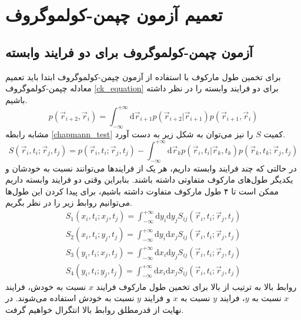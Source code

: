 \chapter{تعمیم آزمون چپمن-کولموگروف}
\label{ch3} 

\section{آزمون چپمن-کولموگروف برای دو فرایند وابسته}

برای تخمین طول مارکوف با استفاده از آزمون چپمن-کولموگروف ابتدا باید تعمیم معادله چپمن-کولموگروف \ref{ck_equation} برای دو فرایند وابسته را در نظر داشته باشیم.
\begin{equation}
  p(\vec{r}_{i+2}, \vec{r}_{i})=\int_{-\infty}^{+\infty} \mathrm{d} \vec{r}_{i+1} p(\vec{r}_{i+2} | \vec{r}_{i+1}) p(\vec{r}_{i+1}, \vec{r}_{i})
  \label{ck_equation_vec}
\end{equation}
مشابه رابطه \ref{chapmann_test} کمیت $S$ را نیز می‌توان به شکل زیر به دست آورد.
\begin{equation}
  S(\vec{r}_{i},t_{i}; \vec{r}_{j},t_{j} )=p(\vec{r}_{i}, t_{i} ; \vec{r}_{j}, t_{j})-\int_{-\infty}^{+\infty} \mathrm{d} \vec{r}_k p(\vec{r}_{i}, t_{i} | \vec{r}_k, t_k) p(\vec{r}_k, t_k ; \vec{r}_{j}, t_{j})
\end{equation}
در حالتی که چند فرایند وابسته داریم، هر یک از فرایندها می‌توانند نسبت به خودشان و یکدیگر طول‌های مارکوف‌ متفاوتی داشته باشند. بنابراین وقتی دو فرایند وابسته داریم ممکن است تا ۴ طول مارکوف متفاوت داشته باشیم، برای پیدا کردن این طول‌ها می‌توانیم روابط زیر را در نظر بگریم.
\begin{equation}
\begin{array}{l}
  {S_{1}(x_{i}, t_{i}; x_{j}, t_{j})=\int_{-\infty}^{+\infty} \mathrm{d} y_{i} \mathrm{d} y_{j} S_{i j}(\vec{r}_{i},t_{i}; \vec{r}_{j},t_{j} )} \\
  {S_{2}(x_{i}, t_{i}; y_{j}, t_{j})=\int_{-\infty}^{+\infty} \mathrm{d} y_{i} \mathrm{d} x_{j} S_{i j}(\vec{r}_{i},t_{i}; \vec{r}_{j},t_{j} )} \\
  {S_{3}(y_{i}, t_{i}; x_{j}, t_{j})=\int_{-\infty}^{+\infty} \mathrm{d} x_{i} \mathrm{d} y_{j} S_{i j}(\vec{r}_{i},t_{i}; \vec{r}_{j},t_{j} )} \\
  {S_{4}(y_{i}, t_{i}; y_{j}, t_{j})=\int_{-\infty}^{+\infty} \mathrm{d} x_{i} \mathrm{d} x_{j} S_{i j}(\vec{r}_{i},t_{i}; \vec{r}_{j},t_{j} )}\end{array}
\end{equation}
روابط بالا به ترتیب از بالا برای تخمین طول مارکوف فرایند $x$ نسبت به خودش، فرایند $x$ نسبت به $y$، فرایند $y$ نسبت به $x$ و فرایند $y$ نسبت به خودش استفاده می‌شوند. در نهایت از قدرمطلق روابط بالا انتگرال خواهیم گرفت.
